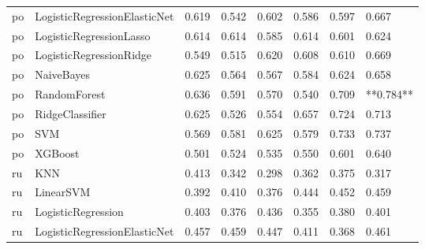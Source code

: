 \begin{tabular}{llllllll}
      po & LogisticRegressionElasticNet & 0.619 &                     0.542 &                 0.602 &                  0.586 &                                   0.597 &     0.667 \\
      po &      LogisticRegressionLasso & 0.614 &                     0.614 &                 0.585 &                  0.614 &                                   0.601 &     0.624 \\
      po &      LogisticRegressionRidge & 0.549 &                     0.515 &                 0.620 &                  0.608 &                                   0.610 &     0.669 \\
      po &                   NaiveBayes & 0.625 &                     0.564 &                 0.567 &                  0.584 &                                   0.624 &     0.658 \\
      po &                 RandomForest & 0.636 &                     0.591 &                 0.570 &                  0.540 &                                   0.709 & **0.784** \\
      po &              RidgeClassifier & 0.625 &                     0.526 &                 0.554 &                  0.657 &                                   0.724 &     0.713 \\
      po &                          SVM & 0.569 &                     0.581 &                 0.625 &                  0.579 &                                   0.733 &     0.737 \\
      po &                      XGBoost & 0.501 &                     0.524 &                 0.535 &                  0.550 &                                   0.601 &     0.640 \\
      ru &                          KNN & 0.413 &                     0.342 &                 0.298 &                  0.362 &                                   0.375 &     0.317 \\
      ru &                    LinearSVM & 0.392 &                     0.410 &                 0.376 &                  0.444 &                                   0.452 &     0.459 \\
      ru &           LogisticRegression & 0.403 &                     0.376 &                 0.436 &                  0.355 &                                   0.380 &     0.401 \\
      ru & LogisticRegressionElasticNet & 0.457 &                     0.459 &                 0.447 &                  0.411 &                                   0.368 &     0.461 \\

\end{tabular}
